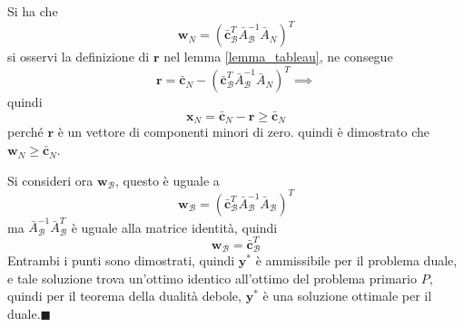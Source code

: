 \documentclass[10pt, letterpaper]{report}
\begin{document}
Si ha che $$ 
\mathbf w_N=( \bar {\mathbf c}^T_{\mathcal{B}}\bar A^{-1}_{\mathcal B}\bar A_N)^T
$$
si osservi la definizione di $\mathbf r$ nel lemma \ref{lemma_tableau}, ne consegue 
$$ \mathbf r = \bar{\mathbf c}_N-( \bar {\mathbf c}^T_{\mathcal{B}}\bar A^{-1}_{\mathcal B}\bar A_N)^T \implies  $$
quindi 
$$ \mathbf x_N=\bar{\mathbf c}_N-\mathbf r \ge  \bar{\mathbf c}_N $$
perché $\mathbf r$ è un vettore di componenti minori di zero. quindi è dimostrato che  $\mathbf w_N \ge \bar{\mathbf c}_N$.\bigskip

Si consideri ora  $\mathbf w_{\mathcal B}$, questo è uguale a 
$$ \mathbf w_{\mathcal B} = ( \bar {\mathbf c}^T_{\mathcal{B}}\bar A^{-1}_{\mathcal B}\bar A_{\mathcal B})^T$$
ma $\bar A^{-1}_{\mathcal B}\bar A_{\mathcal B}^T$ è uguale alla matrice identità, quindi 
$$ \mathbf w_{\mathcal B} =\bar {\mathbf c}^T_{\mathcal{B}}$$
Entrambi i punti sono dimostrati, quindi $\mathbf y^*$ è ammissibile per il problema duale, e tale soluzione trova un'ottimo identico all'ottimo del problema primario $P$, quindi per il teorema della dualità debole,  $\mathbf y^*$ è una soluzione ottimale per il duale.\hfill$\blacksquare$
\end{document}
